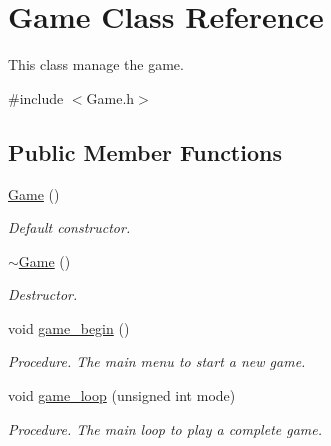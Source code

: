 \hypertarget{classGame}{}\section{Game Class Reference}
\label{classGame}


This class manage the game.  




{\ttfamily \#include $<$Game.\+h$>$}

\subsection*{Public Member Functions}
\begin{DoxyCompactItemize}
\item 
\hyperlink{classGame_ad59df6562a58a614fda24622d3715b65}{Game} ()\hypertarget{classGame_ad59df6562a58a614fda24622d3715b65}{}\label{classGame_ad59df6562a58a614fda24622d3715b65}

\begin{DoxyCompactList}\small\item\em Default constructor. \end{DoxyCompactList}\item 
\hyperlink{classGame_ae3d112ca6e0e55150d2fdbc704474530}{$\sim$\+Game} ()\hypertarget{classGame_ae3d112ca6e0e55150d2fdbc704474530}{}\label{classGame_ae3d112ca6e0e55150d2fdbc704474530}

\begin{DoxyCompactList}\small\item\em Destructor. \end{DoxyCompactList}\item 
void \hyperlink{classGame_a1f31a41ed62f59a3fb0120fccd312602}{game\+\_\+begin} ()\hypertarget{classGame_a1f31a41ed62f59a3fb0120fccd312602}{}\label{classGame_a1f31a41ed62f59a3fb0120fccd312602}

\begin{DoxyCompactList}\small\item\em Procedure. The main menu to start a new game. \end{DoxyCompactList}\item 
void \hyperlink{classGame_a147191e57dbc3a536a3f933ec1cf39dc}{game\+\_\+loop} (unsigned int mode)
\begin{DoxyCompactList}\small\item\em Procedure. The main loop to play a complete game. \end{DoxyCompactList}\end{DoxyCompactItemize}


